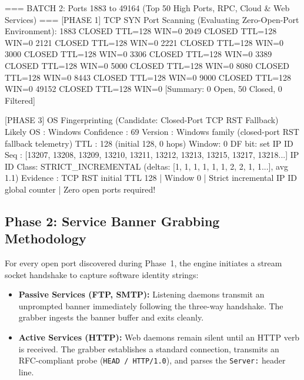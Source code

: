 \begin{logbox}
=== BATCH 2: Ports 1883 to 49164 (Top 50 High Ports, RPC, Cloud & Web Services) ===
[PHASE 1] TCP SYN Port Scanning (Evaluating Zero-Open-Port Environment):
  1883  CLOSED  TTL=128 WIN=0    2049  CLOSED  TTL=128 WIN=0
  2121  CLOSED  TTL=128 WIN=0    2221  CLOSED  TTL=128 WIN=0
  3000  CLOSED  TTL=128 WIN=0    3306  CLOSED  TTL=128 WIN=0
  3389  CLOSED  TTL=128 WIN=0    5000  CLOSED  TTL=128 WIN=0
  8080  CLOSED  TTL=128 WIN=0    8443  CLOSED  TTL=128 WIN=0
  9000  CLOSED  TTL=128 WIN=0   49152  CLOSED  TTL=128 WIN=0
[Summary: 0 Open, 50 Closed, 0 Filtered]

[PHASE 3] OS Fingerprinting (Candidate: Closed-Port TCP RST Fallback)
  Likely OS  : Windows                 Confidence : 69%
  Version    : Windows family (closed-port RST fallback telemetry)
  TTL        : 128 (initial 128, 0 hops)   Window: 0        DF bit: set
  IP ID Seq  : [13207, 13208, 13209, 13210, 13211, 13212, 13213, 13215, 13217, 13218...]
  IP ID Class: STRICT_INCREMENTAL (deltas: [1, 1, 1, 1, 1, 1, 2, 2, 1, 1...], avg 1.1)
  Evidence   : TCP RST initial TTL 128 | Window 0 | Strict incremental IP ID global counter | Zero open ports required!
\end{logbox}

\subsection{Phase 2: Service Banner Grabbing Methodology}
For every open port discovered during Phase~1, the engine initiates a stream socket handshake to
capture software identity strings:
\begin{itemize}
    \item \textbf{Passive Services (FTP, SMTP):} Listening daemons transmit an unprompted banner
    immediately following the three-way handshake. The grabber ingests the banner buffer and exits cleanly.
    \item \textbf{Active Services (HTTP):} Web daemons remain silent until an HTTP verb is received.
    The grabber establishes a standard connection, transmits an RFC-compliant probe (\texttt{HEAD / HTTP/1.0}),
    and parses the \texttt{Server:} header line.
\end{itemize}

